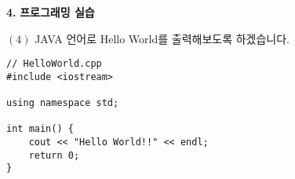 \begin{flushleft}
    {\setmainfont[Path=FONT/]{KOPUBWORLD_DOTUM_PRO_BOLD.OTF}\textcolor{skyblue2}{{\huge\textbf{4.}}}}
    {\textcolor{skyblue2}{{\huge\textbf{프로그래밍 실습}}}}
\end{flushleft}

\begin{flushleft}
    $(4)$ JAVA 언어로 Hello World를 출력해보도록 하겠습니다.
\end{flushleft}

\begin{lstlisting}
// HelloWorld.cpp
#include <iostream>

using namespace std;

int main() {
    cout << "Hello World!!" << endl;
    return 0;
}
\end{lstlisting}